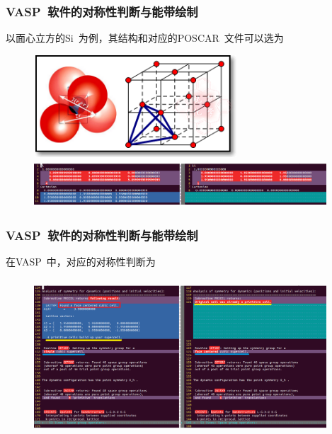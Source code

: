 \documentclass[cjk,slidestop,handout,compress,mathserif,blue]{beamer}	%
\begin{document}
\frame
{
	\frametitle{\textrm{VASP~}软件的对称性判断与能带绘制}
	以面心立方的\textrm{Si~}为例，其结构和对应的\textrm{POSCAR~}文件可以选为
\begin{figure}[h!]
\centering
\vspace*{-0.1in}
\includegraphics[height=1.5in,width=3.0in,viewport=0 0 350 160,clip]{Figures/FCC_Si.png}
\vskip 0.1in
\hspace*{-0.15in}
\includegraphics[height=0.7in,width=4.3in,viewport=0 0 1080 160,clip]{Figures/VASP_FCC_Si_POSCAR.png}
\caption{\fontsize{7.2pt}{4.2pt}}%
\label{FCC_Si-POSCAR}
\end{figure} 
}

\frame
{
	\frametitle{\textrm{VASP~}软件的对称性判断与能带绘制}
	在\textrm{VASP~}中，对应的对称性判断为
\begin{figure}[h!]
\centering
\vspace*{-0.1in}
\hspace*{-0.15in}
\includegraphics[height=2.3in,width=4.3in,viewport=0 0 1080 530,clip]{Figures/VASP_FCC_Si_symmetry.png}
\label{FCC_Si-OUTCAR}
\end{figure} 
}
\end{document}

